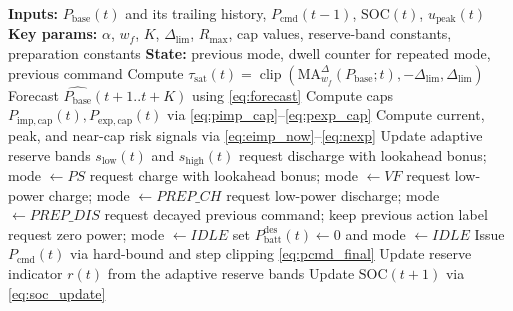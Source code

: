 \documentclass[preprint,12pt]{elsarticle}
\def\texttt#1{#1}%
\newcommand{\Rmax}{R_{\max}}
\newcommand{\SOC}{\mathrm{SOC}}
\newcommand{\Pbatt}{P_{\mathrm{batt}}}
\newcommand{\Pcmd}{P_{\mathrm{cmd}}}
\newcommand{\Pbase}{P_{\mathrm{base}}}
\newcommand{\MA}{\mathrm{MA}}
\newcommand{\Dlim}{\Delta_{\lim}}
\DeclareMathOperator{\clip}{clip}
\begin{document}
\begin{algorithm}[H]
\caption{FGCRP supervisory scheme: forecast-guided cap correction and reserve preparation}
\label{alg:plc}
\begin{algorithmic}[1]
\State \textbf{Inputs:} $\Pbase(t)$ and its trailing history, $\Pcmd(t-1)$, $\SOC(t)$, $u_{\mathrm{peak}}(t)$
\State \textbf{Key params:} $\alpha$, $w_f$, $K$, $\Dlim$, $\Rmax$, cap values, reserve-band constants, preparation constants
\State \textbf{State:} previous mode, dwell counter for repeated mode, previous command
  \State Compute $\tau_{\mathrm{sat}}(t)=\clip(\MA^{\Delta}_{w_f}(\Pbase;t),-\Dlim,\Dlim)$
  \State Forecast $\widehat{\Pbase}(t+1..t+K)$ using \eqref{eq:forecast}
  \State Compute caps $P_{\mathrm{imp,cap}}(t),P_{\mathrm{exp,cap}}(t)$ via \eqref{eq:pimp_cap}--\eqref{eq:pexp_cap}
  \State Compute current, peak, and near-cap risk signals via \eqref{eq:eimp_now}--\eqref{eq:nexp}
  \State Update adaptive reserve bands $s_{\mathrm{low}}(t)$ and $s_{\mathrm{high}}(t)$
    \State request discharge with lookahead bonus; mode $\gets \texttt{PS}$
    \State request charge with lookahead bonus; mode $\gets \texttt{VF}$
    \State request low-power charge; mode $\gets \texttt{PREP\_CH}$
    \State request low-power discharge; mode $\gets \texttt{PREP\_DIS}$
    \State request decayed previous command; keep previous action label
  \Else
    \State request zero power; mode $\gets \texttt{IDLE}$
  \EndIf
  \If{$|\Pbatt^{\mathrm{des}}(t)|<0.25$}
    \State set $\Pbatt^{\mathrm{des}}(t)\gets 0$ and mode $\gets \texttt{IDLE}$
  \EndIf
  \State Issue $\Pcmd(t)$ via hard-bound and step clipping \eqref{eq:pcmd_final}
  \State Update reserve indicator $r(t)$ from the adaptive reserve bands
  \State Update $\SOC(t{+}1)$ via \eqref{eq:soc_update}
\EndFor
\end{algorithmic}
\end{algorithm}
\end{document}
